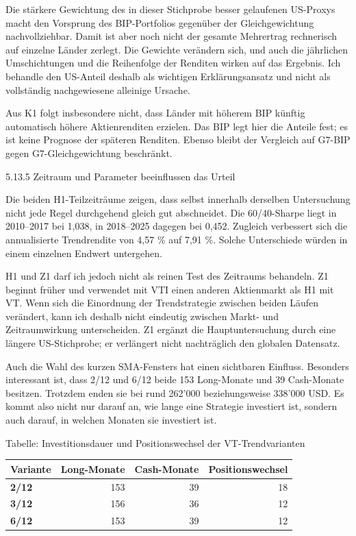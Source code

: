 \documentclass[
  ngerman,
  a4paper,
  DIV=11,
  oneside]{scrreprt}
\newcounter{none} %
\begin{document}
Die stärkere Gewichtung des in dieser Stichprobe besser gelaufenen
US-Proxys macht den Vorsprung des BIP-Portfolios gegenüber der
Gleichgewichtung nachvollziehbar. Damit ist aber noch nicht der gesamte
Mehrertrag rechnerisch auf einzelne Länder zerlegt. Die Gewichte
verändern sich, und auch die jährlichen Umschichtungen und die
Reihenfolge der Renditen wirken auf das Ergebnis. Ich behandle den
US-Anteil deshalb als wichtigen Erklärungsansatz und nicht als
vollständig nachgewiesene alleinige Ursache.

Aus K1 folgt insbesondere nicht, dass Länder mit höherem BIP künftig
automatisch höhere Aktienrenditen erzielen. Das BIP legt hier die
Anteile fest; es ist keine Prognose der späteren Renditen. Ebenso bleibt
der Vergleich auf G7-BIP gegen G7-Gleichgewichtung beschränkt.

5.13.5 Zeitraum und Parameter beeinflussen das Urteil

Die beiden H1-Teilzeiträume zeigen, dass selbst innerhalb derselben
Untersuchung nicht jede Regel durchgehend gleich gut abschneidet. Die
60/40-Sharpe liegt in 2010--2017 bei 1,038, in 2018--2025 dagegen bei
0,452. Zugleich verbessert sich die annualisierte Trendrendite von 4,57
\% auf 7,91 \%. Solche Unterschiede würden in einem einzelnen Endwert
untergehen.

H1 und Z1 darf ich jedoch nicht als reinen Test des Zeitraums behandeln.
Z1 beginnt früher und verwendet mit VTI einen anderen Aktienmarkt als H1
mit VT. Wenn sich die Einordnung der Trendstrategie zwischen beiden
Läufen verändert, kann ich deshalb nicht eindeutig zwischen Markt- und
Zeitraumwirkung unterscheiden. Z1 ergänzt die Hauptuntersuchung durch
eine längere US-Stichprobe; er verlängert nicht nachträglich den
globalen Datensatz.

Auch die Wahl des kurzen SMA-Fensters hat einen sichtbaren Einfluss.
Besonders interessant ist, dass 2/12 und 6/12 beide 153 Long-Monate und
39 Cash-Monate besitzen. Trotzdem enden sie bei rund 262'000
beziehungsweise 338'000 USD. Es kommt also nicht nur darauf an, wie
lange eine Strategie investiert ist, sondern auch darauf, in welchen
Monaten sie investiert ist.

Tabelle: Investitionsdauer und Positionswechsel der VT-Trendvarianten

{\def\LTcaptype{none} %
\begin{longtable}[]{@{}lrrr@{}}
\toprule\noalign{}
Variante & Long-Monate & Cash-Monate & Positionswechsel \\
\midrule\noalign{}
\endhead
\bottomrule\noalign{}
\endlastfoot
\textbf{2/12} & 153 & 39 & 18 \\
\textbf{3/12} & 156 & 36 & 12 \\
\textbf{6/12} & 153 & 39 & 12 \\
\end{longtable}
}
\end{document}
